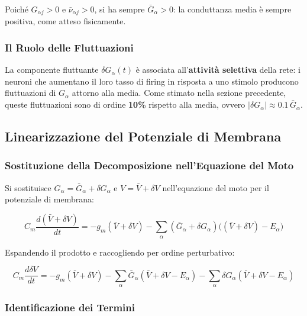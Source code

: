 Poiché $G_{\alpha j} > 0$ e $\bar{\nu}_{\alpha j} > 0$, si ha sempre $\bar{G}_\alpha > 0$: la conduttanza media è sempre positiva, come atteso fisicamente.

\subsubsection{Il Ruolo delle Fluttuazioni}

La componente fluttuante $\delta G_\alpha(t)$ è associata all'\textbf{attività selettiva} della rete: i neuroni che aumentano il loro tasso di firing in risposta a uno stimolo producono fluttuazioni di $G_\alpha$ attorno alla media. Come stimato nella sezione precedente, queste fluttuazioni sono di ordine \textbf{10\%} rispetto alla media, ovvero $|\delta G_\alpha| \approx 0.1\,\bar{G}_\alpha$.

\subsection{Linearizzazione del Potenziale di Membrana}

\subsubsection{Sostituzione della Decomposizione nell'Equazione del Moto}

Si sostituisce $G_\alpha = \bar{G}_\alpha + \delta G_\alpha$ e $V = \bar{V} + \delta V$ nell'equazione del moto per il potenziale di membrana:

\begin{equation}
C_m \frac{d(\bar{V} + \delta V)}{dt} = -g_m(\bar{V} + \delta V) - \sum_\alpha (\bar{G}_\alpha + \delta G_\alpha)\bigl((\bar{V} + \delta V) - E_\alpha\bigr)
\end{equation}

Espandendo il prodotto e raccogliendo per ordine perturbativo:

\begin{equation}
C_m \frac{d \delta V}{dt} = -g_m(\bar{V} + \delta V) - \sum_\alpha \bar{G}_\alpha(\bar{V} + \delta V - E_\alpha) - \sum_\alpha \delta G_\alpha(\bar{V} + \delta V - E_\alpha)
\end{equation}

\subsubsection{Identificazione dei Termini}

